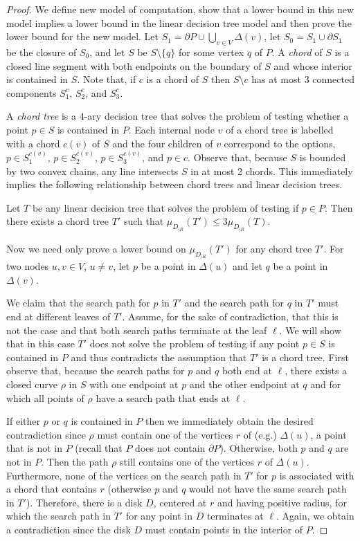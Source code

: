 \documentclass[charterfonts,lotsofwhite]{patmorin}
\newcommand{\boundary}{\partial}
\begin{document}
\begin{proof}
We define new model of computation, show that a lower bound in this
new model implies a lower bound in the linear decision tree model and
then prove the lower bound for the new model.  Let $S_1= \boundary P
\cup \bigcup_{v\in V} \Delta(v)$, let $S_0=S_1\cup\boundary S_1$ be
the closure of $S_0$, and let $S$ be $S\setminus\{q\}$ for some vertex
$q$ of $P$.  A \emph{chord} of $S$ is a closed line segment with both
endpoints on the boundary of $S$ and whose interior is contained in
$S$. Note that, if $c$ is a chord of $S$ then $S\setminus c$ has at
most 3 connected components $S^c_1$, $S^c_2$, and $S^c_3$.

A \emph{chord tree} is a $4$-ary decision tree that solves the problem
of testing whether a point $p\in S$ is contained in $P$.  Each
internal node $v$ of a chord tree is labelled with a chord $c(v)$ of
$S$ and the four children of $v$ correspond to the options,
$p\in S^{c(v)}_1$, $p\in S^{c(v)}_2$, $p\in S^{c(v)}_3$, and $p\in c$.
Observe that, because $S$ is bounded by two convex chains, any line
intersects $S$ in at most 2 chords.  This immediately implies the
following relationship between chord trees and linear decision trees.
\begin{clm}
Let $T$ be any linear decision tree that solves the problem of testing
if $p\in P$.  Then there exists a chord tree $T'$ such that 
$\mu_{D_{|R}}(T') \le 3\mu_{D_{|R}}(T)$.
\end{clm}

Now we need only prove a lower bound on $\mu_{D_{|R}}(T')$ for any
chord tree $T'$.  For two nodes $u,v\in V$, $u\neq v$, let $p$ be a
point in $\Delta(u)$ and let $q$ be a point in $\Delta(v)$.  

We claim that the search path for $p$ in $T'$ and the search path for
$q$ in $T'$ must end at different leaves of $T'$.  Assume, for the
sake of contradiction, that this is not the case and that both search
paths terminate at the leaf $\ell$. We will show that in this case
$T'$ does not solve the problem of testing if any point $p\in S$ is
contained in $P$ and thus contradicts the assumption that $T'$ is a
chord tree.  First observe that, because the search paths for $p$ and
$q$ both end at $\ell$, there exists a closed curve
$\rho$ in $S$ with one endpoint at $p$ and the other endpoint at $q$
and for which all points of $\rho$ have a search path that ends at
$\ell$.

If either $p$ or $q$ is contained in $P$ then we immediately obtain
the desired contradiction since $\rho$ must contain one of the
vertices $r$ of (e.g.) $\Delta(u)$, a point that is not in $P$ (recall
that $P$ does not contain $\boundary P$).
Otherwise, both $p$ and $q$ are not in $P$.  Then the path $\rho$
still contains one of the vertices $r$ of $\Delta(u)$.  Furthermore,
none of the vertices on the search path in $T'$ for $p$ is associated
with a chord that contains $r$ (otherwise $p$ and $q$ would not have
the same search path in $T'$).  Therefore, there is a disk $D$,
centered at $r$ and having positive radius, for which the search path
in $T'$ for any point in $D$ terminates at $\ell$.  Again, we obtain a
contradiction since the disk $D$ must contain points in the interior
of $P$.


\end{proof}
\end{document}

